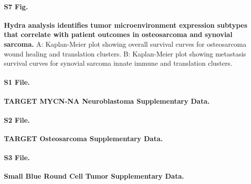\documentclass[10pt,letterpaper]{article}
\begin{document}
\paragraph*{S7 Fig.}
\label{S7_Fig} {\bf Hydra analysis identifies tumor microenvironment expression subtypes that correlate with patient outcomes in osteosarcoma and synovial sarcoma.} A: Kaplan-Meier plot showing overall survival curves for osteosarcoma wound healing and translation clusters. B: Kaplan-Meier plot showing metastasis survival curves for synovial sarcoma innate immune and translation clusters.

\paragraph*{S1 File.}
\label{S1_File}
{\bf TARGET MYCN-NA Neuroblastoma Supplementary Data.}

\paragraph*{S2 File.}
\label{S2_File}
{\bf TARGET Osteosarcoma Supplementary Data.}

\paragraph*{S3 File.}
\label{S3_File}
{\bf Small Blue Round Cell Tumor Supplementary Data.}



\end{document}
